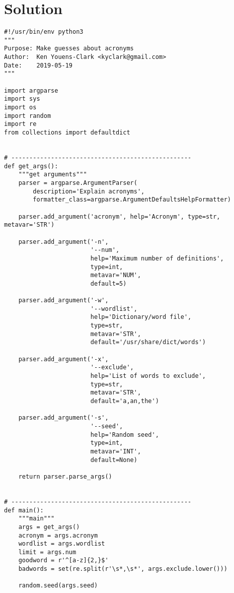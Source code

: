 \documentclass[]{article}
\begin{document}
\pagebreak

\hypertarget{solution-12}{%
\section{Solution}\label{solution-12}}

\begin{verbatim}
#!/usr/bin/env python3
"""
Purpose: Make guesses about acronyms
Author:  Ken Youens-Clark <kyclark@gmail.com>
Date:    2019-05-19
"""

import argparse
import sys
import os
import random
import re
from collections import defaultdict


# --------------------------------------------------
def get_args():
    """get arguments"""
    parser = argparse.ArgumentParser(
        description='Explain acronyms',
        formatter_class=argparse.ArgumentDefaultsHelpFormatter)

    parser.add_argument('acronym', help='Acronym', type=str, metavar='STR')

    parser.add_argument('-n',
                        '--num',
                        help='Maximum number of definitions',
                        type=int,
                        metavar='NUM',
                        default=5)

    parser.add_argument('-w',
                        '--wordlist',
                        help='Dictionary/word file',
                        type=str,
                        metavar='STR',
                        default='/usr/share/dict/words')

    parser.add_argument('-x',
                        '--exclude',
                        help='List of words to exclude',
                        type=str,
                        metavar='STR',
                        default='a,an,the')

    parser.add_argument('-s',
                        '--seed',
                        help='Random seed',
                        type=int,
                        metavar='INT',
                        default=None)

    return parser.parse_args()


# --------------------------------------------------
def main():
    """main"""
    args = get_args()
    acronym = args.acronym
    wordlist = args.wordlist
    limit = args.num
    goodword = r'^[a-z]{2,}$'
    badwords = set(re.split(r'\s*,\s*', args.exclude.lower()))

    random.seed(args.seed)


\end{verbatim}
\end{document}
